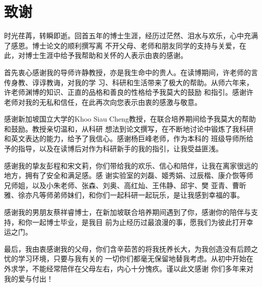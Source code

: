 
\chapter*{致谢}

时光荏苒，转瞬即逝。回首五年的博士生涯，经历过茫然、泪水与欢乐，心中充满了感恩。博士论文的顺利撰写离
不开父母、老师和朋友同学的支持与关爱，在此，对博士生涯中给予我帮助和关怀的人表示由衷的感谢。

首先衷心感谢我的导师许静教授，亦是我生命中的贵人。在读博期间，许老师的言传身教、谆谆教诲，对我的学
习、科研和生活带来了极大的帮助。从师六年来，许老师渊博的知识、正直的品格和善良的性格给予我莫大的鼓励
和指引。感谢许老师对我的无私和信任，在此再次向您表示由衷的感激与敬意。

感谢新加坡国立大学的Khoo Siau Cheng教授，在联合培养期间给予我莫大的帮助和鼓励。教授亲切温和，从科研
想法到论文撰写，在不断地讨论中锻炼了我科研和英文表达的能力，给予了我信心。感谢杨巨峰老师，作为本科的
班级导师所给予的指导，以及在读博后对作为科研新手的我的指引，让我受益匪浅。

感谢我的挚友彭程和宋文莉，你们带给我的欢乐、信心和陪伴，让我在离家很远的地方，拥有了安全和满足感。感
谢实验室的刘磊、姬秀娟、过辰楷、康介恢等师兄师姐，以及小朱老师、张森、刘奥、高红灿、王伟静、邱宇、樊
亚青、曹昕雅、徐亦凡等师弟师妹们，和你们一起科研一起玩乐，是让我感到幸福的事。

感谢我的男朋友蔡祥睿博士，在新加坡联合培养期间遇到了你，感谢你的陪伴与支持，和你一起博士毕业，是我目
前为止经历过最浪漫的事，愿我们为彼此打开幸运之门。

最后，我由衷感谢我的父母，你们含辛茹苦的将我抚养长大，为我创造没有后顾之忧的学习环境，只要与我有关的
一切你们都毫无保留地替我考虑。从初中开始在外求学，不能经常陪伴在父母左右，内心十分愧疚。谨以此文感谢
你们多年来对我的爱与付出！


